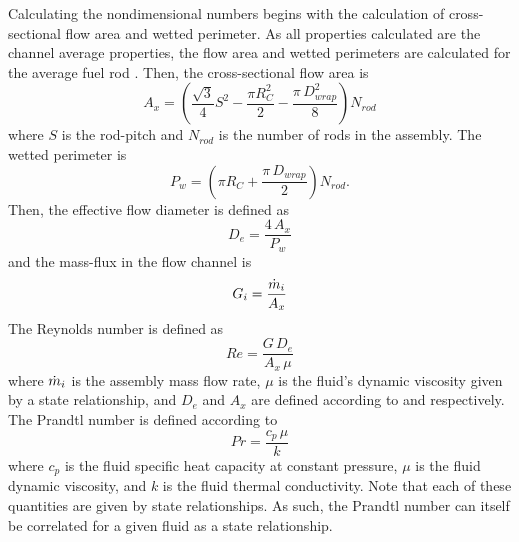       Calculating the nondimensional numbers begins with the calculation of 
      cross-sectional flow area and wetted perimeter. As all properties 
      calculated are the channel average properties, the flow area and wetted
      perimeters are calculated for the average fuel rod 
      \cite{FastSpectrumReactors}. Then, the cross-sectional flow area is
      \begin{equation}
        \label{eq:correlation_ax}
        A_x = \left(\frac{\sqrt{3}}{4} S^2 - \frac{\pi R_C^2}{2} - 
          \frac{\pi \, D_{wrap}^2}{8} \right) N_{rod}
      \end{equation}
      where $S$ is the rod-pitch and $N_{rod}$ is the number of rods in the 
      assembly. The wetted perimeter is
      \begin{equation}
        \label{eq:correlation_pw}
        P_w = \left(\pi R_C + \frac{\pi\,D_{wrap}}{2}\right) N_{rod}.
      \end{equation}
      Then, the effective flow diameter is defined as
      \begin{equation}
        \label{eq:correlation_de}
        D_e = \frac{4 \, A_x}{P_w}
      \end{equation}
      and the mass-flux in the flow channel is 
      \begin{equation}
        \label{eq:correlation_g}
        G_i = \frac{\dot{m}_i}{A_x}
      \end{equation}
      The Reynolds number is defined as
      \begin{equation}
        \label{eq:re}
        Re = \frac{G \, D_e}{A_x \, \mu}
      \end{equation}
      where $\dot{m}_i$ is the assembly mass flow rate, $\mu$ is the fluid's
      dynamic viscosity given by a state relationship, and $D_e$ and $A_x$ are 
      defined according to  and 
      respectively. The Prandtl number is defined according to 
      \begin{equation}
        \label{eq:pr}
        Pr = \frac{c_p \, \mu}{k}
      \end{equation}
      where $c_p$ is the fluid specific heat capacity at constant pressure, 
      $\mu$ is the fluid dynamic viscosity, and $k$ is the fluid thermal 
      conductivity. Note that each of these quantities are given by state 
      relationships. As such, the Prandtl number can itself be correlated for a
      given fluid as a state relationship.
      
